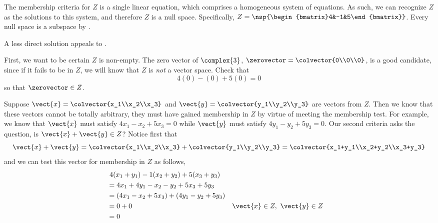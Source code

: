The membership criteria for $Z$ is a single linear equation, which comprises a homogeneous system of equations.  As such, we can recognize $Z$ as the solutions to this system, and therefore $Z$ is a null space.  Specifically, 
$Z=\nsp{\begin{bmatrix}4&-1&5\end{bmatrix}}$.
Every null space is a subspace by .\par
%
A less direct solution appeals to .\par
%
First, we want to be certain $Z$ is non-empty.  The zero vector of $\complex{3}$, $\zerovector=\colvector{0\\0\\0}$, is a good candidate, since if it fails to be in $Z$, we will know that $Z$ is {\em not} a vector space.  Check that
%
\begin{equation*}
4(0)-(0)+5(0)=0
\end{equation*}
%
so that $\zerovector\in Z$.\par
%
Suppose $\vect{x}=\colvector{x_1\\x_2\\x_3}$ and $\vect{y}=\colvector{y_1\\y_2\\y_3}$ are vectors from $Z$.  Then we know that these vectors cannot be totally arbitrary, they must have gained membership in $Z$ by virtue of meeting the membership test.  For example, we know that $\vect{x}$ must satisfy $4x_1-x_2+5x_3=0$ while $\vect{y}$ must satisfy $4y_1-y_2+5y_3=0$.  Our second criteria asks the question, is $\vect{x}+\vect{y}\in Z$?  Notice first that 
%
\begin{equation*}
\vect{x}+\vect{y}=\colvector{x_1\\x_2\\x_3}+\colvector{y_1\\y_2\\y_3}=
\colvector{x_1+y_1\\x_2+y_2\\x_3+y_3}
\end{equation*}
%
and we can test this vector for membership in $Z$ as follows,
\begin{align*}
&\ 4(x_1+y_1)-1(x_2+y_2)+5(x_3+y_3)\\
&=4x_1+4y_1-x_2-y_2+5x_3+5y_3\\
&=(4x_1-x_2+5x_3)+(4y_1-y_2+5y_3)\\
&=0 + 0&&\vect{x}\in Z,\ \vect{y}\in Z\\
&=0
\end{align*}
